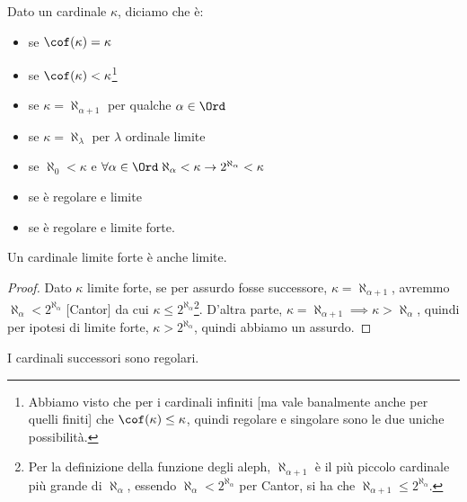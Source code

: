\documentclass[11pt]{scrartcl}
\begin{document}
\begin{definition}
	Dato un cardinale $\kappa$, diciamo che è:
	\begin{itemize}
		\item {} se $\cof(\kappa) = \kappa$
		\item {} se $\cof(\kappa) < \kappa$\footnote{Abbiamo visto che per i cardinali infiniti [ma vale banalmente anche per quelli finiti] che $\cof(\kappa) \leq \kappa$, quindi regolare e singolare sono le due uniche possibilità.}
		\item {} se $\kappa = \aleph_{\alpha + 1}$ per qualche $\alpha \in \Ord$
		\item {} se $\kappa = \aleph_{\lambda}$ per $\lambda$ ordinale limite
		\item {} se $\aleph_0 < \kappa$ e $\forall \alpha \in \Ord \; \aleph_\alpha < \kappa \rightarrow 2^{\aleph_\alpha} < \kappa$
		\item {} se è regolare e limite
		\item {} se è regolare e limite forte.
	\end{itemize}
\end{definition}

\begin{proposition}
	Un cardinale limite forte è anche limite.
\end{proposition}

\begin{proof}
	Dato $\kappa$ limite forte, se per assurdo fosse successore, $\kappa = \aleph_{\alpha + 1}$, avremmo
	$\aleph_\alpha < 2^{\aleph_{\alpha}}$ [Cantor] da cui $\kappa \leq 2^{\aleph_{\alpha}}$\footnote{Per la definizione della funzione degli aleph, $\aleph_{\alpha + 1}$ è il più piccolo cardinale più grande di $\aleph_\alpha$, essendo $\aleph_\alpha < 2^{\aleph_\alpha}$ per Cantor, si ha che $\aleph_{\alpha + 1} \leq 2^{\aleph_\alpha}$.}.
	D'altra parte, $\kappa = \aleph_{\alpha + 1} \implies \kappa > \aleph_\alpha$, quindi per ipotesi di limite forte, $\kappa > 2^{\aleph_\alpha}$, quindi abbiamo un assurdo.
\end{proof}

\begin{proposition}
	I cardinali successori sono regolari.
\end{proposition}
\end{document}
